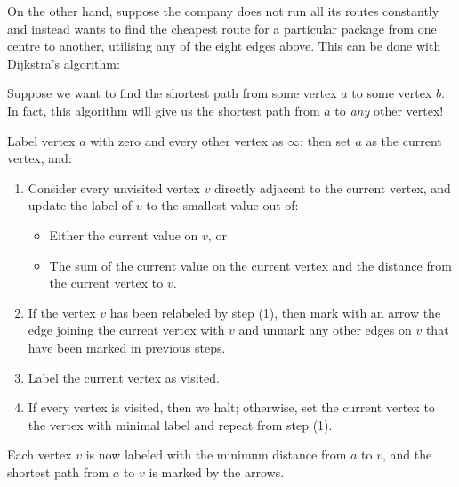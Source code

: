 On the other hand, suppose the company does not run all its routes constantly and instead wants to find the cheapest route for a particular
package from one centre to another, utilising any of the eight edges above. This can be done with Dijkstra's algorithm:
\begin{alg}[Dijkstra]\leavevmode
  Suppose we want to find the shortest path from some vertex $ a $ to some vertex $ b $. In fact, this algorithm will
  give us the shortest path from $ a $ to \emph{any} other vertex!

  Label vertex $ a $ with zero and every other vertex as $ \infty $; then set $ a $ as the current vertex, and:
  \begin{enumerate}
    \item Consider every unvisited vertex $ v $ directly adjacent to the current vertex, and update the label of $ v $ to the smallest value out of:
      \begin{itemize}
        \item Either the current value on $ v $, or
        \item The sum of the current value on the current vertex and the distance from the current vertex to $ v $.
      \end{itemize}
    \item If the vertex $ v $ has been relabeled by step (1), then mark with an arrow the edge joining the current vertex with $ v $ and unmark any
          other edges on $ v $ that have been marked in previous steps.
    \item Label the current vertex as visited.
    \item If every vertex is visited, then we halt; otherwise, set the current vertex to the vertex with minimal label and repeat from step (1).
  \end{enumerate}
  Each vertex $ v $ is now labeled with the minimum distance from $ a $ to $ v $, and the shortest path from $ a $ to $ v $ is marked by the arrows.
\end{alg}

